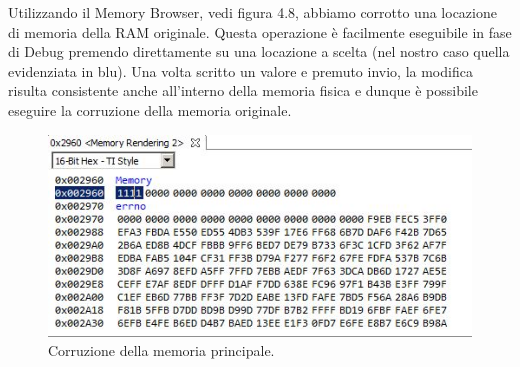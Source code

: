 \documentclass[LaM,binding=0.6cm,oneside]{../sapthesis}
\begin{document}
Utilizzando il Memory Browser, vedi figura 4.8, abbiamo corrotto una locazione di memoria della RAM originale. Questa operazione è facilmente eseguibile in fase di Debug premendo direttamente su una locazione a scelta (nel nostro caso quella evidenziata in blu). Una volta scritto un valore e premuto invio, la modifica risulta consistente anche all'interno della memoria fisica e dunque è possibile eseguire la corruzione della memoria originale.

\begin{figure}[htbp]
\centerline{\includegraphics[scale=0.8]{examples/3_MemoryBrowserCorruzione.JPG}}
\caption{Corruzione della memoria principale.}
\label{fig}
\end{figure}
\vspace{0.5cm}
\end{document}
